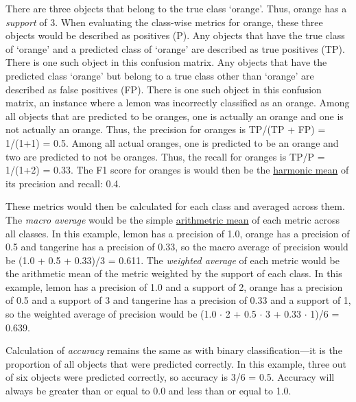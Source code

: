 \documentclass[letterpaper, 12pt]{article}
\begin{document}
There are three objects that belong to the true class `orange'. Thus, orange has a \emph{support} of 3. When evaluating the class-wise metrics for orange, these three objects would be described as positives (P). Any objects that have the true class of `orange' and a predicted class of `orange' are described as true positives (TP). There is one such object in this confusion matrix. Any objects that have the predicted class `orange' but belong to a true class other than `orange' are described as false positives (FP). There is one such object in this confusion matrix, an instance where a lemon was incorrectly classified as an orange. Among all objects that are predicted to be oranges, one is actually an orange and one is not actually an orange. Thus, the precision for oranges is TP/(TP + FP) = 1/(1+1) = 0.5. Among all actual oranges, one is predicted to be an orange and two are predicted to not be oranges. Thus, the recall for oranges is TP/P = 1/(1+2) = 0.33. The F1 score for oranges is would then be the \href{https://en.wikipedia.org/wiki/Harmonic_mean}{harmonic mean} of its precision and recall: 0.4.

These metrics would then be calculated for each class and averaged across them. The \emph{macro average} would be the simple \href{https://en.wikipedia.org/wiki/Arithmetic_mean}{arithmetric mean} of each metric across all classes. In this example, lemon has a precision of 1.0, orange has a precision of 0.5 and tangerine has a precision of 0.33, so the macro average of precision would be (1.0 + 0.5 + 0.33)/3 = 0.611. The \emph{weighted average} of each metric would be the arithmetic mean of the metric weighted by the support of each class. In this example, lemon has a precision of 1.0 and a support of 2, orange has a precision of 0.5 and a support of 3 and tangerine has a precision of 0.33 and a support of 1, so the weighted average of precision would be (1.0 $\cdot$ 2 + 0.5 $\cdot$ 3 + 0.33 $\cdot$ 1)/6 = 0.639.

Calculation of \emph{accuracy} remains the same as with binary classification---it is the proportion of all objects that were predicted correctly. In this example, three out of six objects were predicted correctly, so accuracy is 3/6 = 0.5. Accuracy will always be greater than or equal to 0.0 and less than or equal to 1.0.
\end{document}
